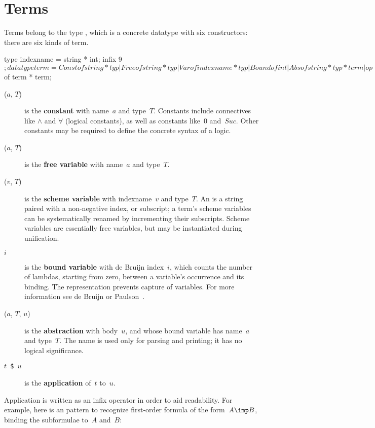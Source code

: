 \section{Terms}
Terms belong to the \ML{} type , which is a concrete datatype
with six constructors: there are six kinds of term.
\begin{ttbox}
type indexname = string * int;
infix 9 $;
datatype term = Const of string * typ
              | Free  of string * typ
              | Var   of indexname * typ
              | Bound of int
              | Abs   of string * typ * term
              | op $  of term * term;
\end{ttbox}
\begin{description}
\item[($a$, $T$)] 
is the {\bf constant} with name~$a$ and type~$T$.  Constants include
connectives like $\land$ and $\forall$ (logical constants), as well as
constants like~0 and~$Suc$.  Other constants may be required to define the
concrete syntax of a logic.

\item[($a$, $T$)] 
is the {\bf free variable} with name~$a$ and type~$T$.

\item[($v$, $T$)] 
is the {\bf scheme variable} with indexname~$v$ and type~$T$.  An
 is a string paired with a non-negative index, or
subscript; a term's scheme variables can be systematically renamed by
incrementing their subscripts.  Scheme variables are essentially free
variables, but may be instantiated during unification.

\item[ $i$] 
is the {\bf bound variable} with de Bruijn index~$i$, which counts the
number of lambdas, starting from zero, between a variable's occurrence and
its binding.  The representation prevents capture of variables.  For more
information see de Bruijn \cite{debruijn72} or
Paulson~\cite[page~336]{paulson91}.

\item[($a$, $T$, $u$)] 
is the {\bf abstraction} with body~$u$, and whose bound variable has
name~$a$ and type~$T$.  The name is used only for parsing and printing; it
has no logical significance.

\item[\tt $t$ \$ $u$] 
is the {\bf application} of~$t$ to~$u$.  
\end{description}
Application is written as an infix operator in order to aid readability.
For example, here is an \ML{} pattern to recognize first-order formula of
the form~$A\imp B$, binding the subformulae to~$A$ and~$B$:


